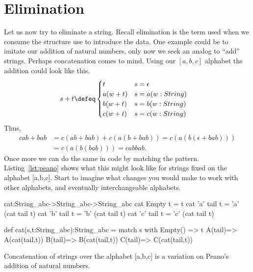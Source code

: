
\section{Elimination}
Let us now try to eliminate a string.  Recall elimination is the term used 
when we consume the structure use to introduce the data.  One example could be to imitate 
our addition of natural numbers, only now we seek an analog to ``add''
strings.  Perhaps concatenation comes to mind.  Using our $[a,b,c]$ 
alphabet ths addition could look like this.
\begin{align*}
    s+t & \defeq \begin{cases}
        t & s=\epsilon\\
        a(w+t) & s= a(w:String)\\
        b(w+t) & s= b(w:String)\\
        c(w+t) & s= c(w:String)\\
    \end{cases}
\end{align*}
Thus,
\begin{align*}
    cab+bab & = c(ab+bab)+c(a(b+bab))=c(a(b(\epsilon+bab)))\\
        & = c(a(b(bab)))=cabbab.
\end{align*}
Once more we can do the same in code by matching the pattern.
Listing~\ref{lst:peano} shows what this might look like for 
strings fixed on the alphabet [a,b,c].  Start to imagine what 
changes you would make to work with other alphabets, and 
eventually interchangeable alphabets.
\begin{lstfloat}
\begin{center}
\begin{Fcode}[]
cat:String_abc->String_abc->String_abc
cat Empty t   = t
cat 'a' tail t = 'a' (cat tail t)
cat 'b' tail t = 'b' (cat tail t)
cat 'c' tail t = 'c' (cat tail t)
\end{Fcode}
\begin{Pcode}[]
def cat(s,t:String_abc):String_abc =
  match s with 
    Empty() => t
    A(tail)=> A(cat(tail,t))
    B(tail)=> B(cat(tail,t))
    C(tail)=> C(cat(tail,t))
\end{Pcode}
\end{center}
\caption{Concatenation of strings over the alphabet [a,b,c] is a variation on 
Peano's addition of natural numbers.}
\label{lst:peano-elim}
\end{lstfloat}
    
